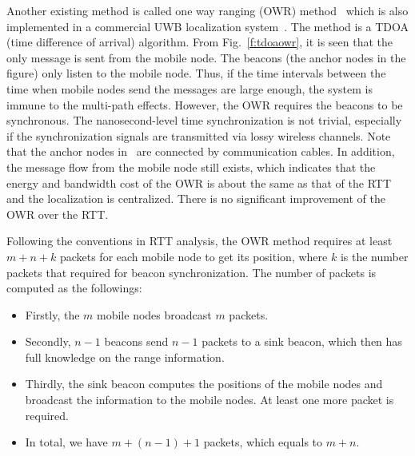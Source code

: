 \begin{itemize}
\end{itemize}

Another existing method is called one way ranging (OWR) method~\cite{Oppermann2004} which is also implemented in a commercial UWB localization system~\cite{FontanaUWB04}. The method is a TDOA (time difference of arrival) algorithm. From Fig.~\ref{f:tdoaowr}, it is seen that the only message is sent from the mobile node. The beacons (the anchor nodes in the figure) only listen to the mobile node. Thus, if the time intervals between the time when mobile nodes send the messages are large enough, the system is immune to the multi-path effects. However, the OWR requires the beacons to be synchronous. The nanosecond-level time synchronization is not trivial, especially if the synchronization signals are transmitted via lossy wireless channels. Note that the anchor nodes in~\cite{FontanaUWB04} are connected by communication cables.
 In addition, the message flow from the mobile node still exists, which indicates that the energy and bandwidth cost of the OWR is about the same as that of the RTT and the localization is centralized. There is no significant improvement of the OWR over the RTT.

Following the conventions in RTT analysis, the OWR method requires at least $m+n+k$ packets for each mobile node to get its position, where $k$ is the number packets that required for beacon synchronization. The number of packets is computed as the followings:

\begin{itemize}
\item   Firstly, the $m$ mobile nodes broadcast $m$ packets.
\item   Secondly, $n-1$ beacons send $n-1$ packets to a sink beacon, which then has full knowledge on the range information.
\item   Thirdly, the sink beacon computes the positions of the mobile nodes and broadcast the information to the mobile nodes. At least one more packet is required.
\item   In total, we have $m+(n-1)+1$ packets, which equals to $m+n$.
\end{itemize}

